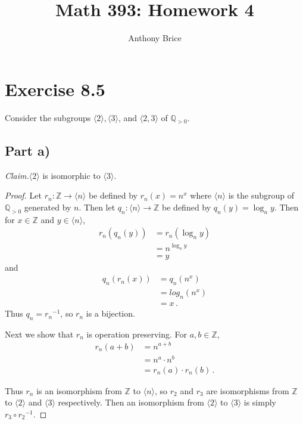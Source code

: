 \documentclass{abrice}
\title{Math 393: Homework 4}
\author{Anthony Brice}
\newcommand{\Z}{\mathbb{Z}}
\newcommand{\Q}{\mathbb{Q}}
\newcommand{\Claim}{\emph{Claim.}\xspace}%
\begin{document}
\maketitle

\section{Exercise 8.5}

Consider the subgroups $\langle 2 \rangle, \langle 3 \rangle$, and $\langle 2,3
\rangle$ of $\Q_{>0}$.

\subsection{Part a)}

\Claim $\langle 2 \rangle$ is isomorphic to $\langle 3 \rangle$.

\begin{proof}
  Let $r_n : \Z \to \langle n \rangle$ be defined by $r_n(x) = n^x$ where
  $\langle n \rangle$ is the subgroup of $\Q_{>0}$ generated by $n$. Then let
  $q_n : \langle n \rangle \to \Z$ be defined by $q_n(y) = \log_n y$. Then for
  $x \in \Z$ and $y \in \langle n \rangle$,
  \begin{align*}
    r_n(q_n(y))
    &= r_n(\log_n y) \\
    &= n^{\log_n y} \\
    &= y
  \end{align*}
  and
  \begin{align*}
    q_n(r_n(x))
    &= q_n(n^x) \\
    &= log_n (n^x) \\
    &= x\, .
  \end{align*}
  Thus $q_n = {r_n}^{-1}$, so $r_n$ is a bijection.

  Next we show that $r_n$ is operation preserving. For $a,b \in \Z$,
  \begin{align*}
    r_n(a + b)
    &= n^{a + b} \\
    &= n^a \cdot n^b \\
    &= r_n(a) \cdot r_n(b)\, .
  \end{align*}

  Thus $r_n$ is an isomorphism from $\Z$ to $\langle n \rangle$, so $r_2$ and
  $r_3$ are isomorphisms from $\Z$ to $\langle 2 \rangle$ and $\langle 3
  \rangle$ respectively. Then an isomorphism from $\langle 2 \rangle$ to
  $\langle 3 \rangle$ is simply $r_3 \circ {r_2}^{-1}$.
\end{proof}
\end{document}
